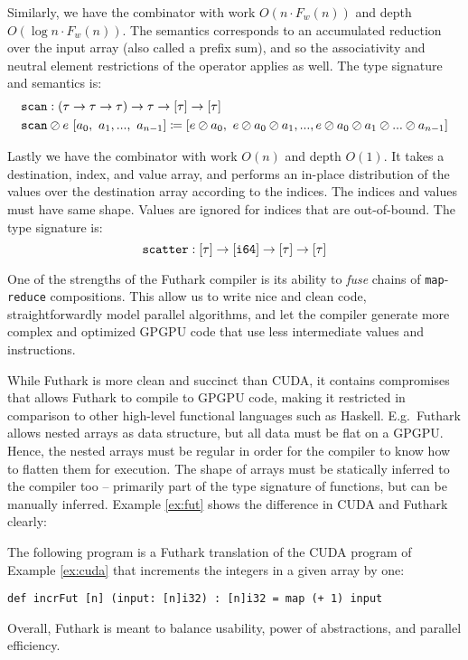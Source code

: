 Similarly, we have the combinator  with work $O(n\cdot F_w(n))$ and depth
$O(\log n \cdot F_w(n))$. The semantics corresponds to an accumulated reduction over
the input array (also called a prefix sum), and so the associativity and neutral
element restrictions of the operator applies as well. The type signature and
semantics is:
\begin{align}
  &\mathtt{scan}:(\tau \to \tau \to \tau) \to \tau \to \mathtt{[}\tau\mathtt{]} \to \mathtt{[}\tau\mathtt{]}\\
  & \mathtt{scan} \oslash e~[a_0,~a_1,...,~a_{n-1}] \coloneq [e \oslash a_0,~e \oslash a_0 \oslash a_1,..., e \oslash a_0 \oslash a_1 \oslash ...\oslash a_{n-1}]
\end{align}

Lastly we have the combinator  with work $O(n)$ and depth $O(1)$.
It takes a destination, index, and value array, and performs an in-place
distribution of the values over the destination array according to the
indices. The indices and values must have same shape. Values are ignored for
indices that are out-of-bound. The type signature is:
\begin{equation}
\mathtt{scatter}:\mathtt{[}\tau\mathtt{]} \to \mathtt{[}\mathtt{i64}\mathtt{]} \to \mathtt{[}\tau\mathtt{]} \to \mathtt{[}\tau\mathtt{]}
\end{equation}

One of the strengths of the Futhark compiler is its ability to \textit{fuse}
chains of \texttt{map}-\texttt{reduce} compositions. This allow us to write nice
and clean code, straightforwardly model parallel algorithms, and let the
compiler generate more complex and optimized GPGPU code that use less
intermediate values and instructions.

While Futhark is more clean and succinct than CUDA, it contains compromises that
allows Futhark to compile to GPGPU code, making it restricted in comparison to
other high-level functional languages such as Haskell. E.g.\ Futhark allows
nested arrays as data structure, but all data must be flat on a GPGPU. Hence,
the nested arrays must be regular in order for the compiler to know how to
flatten them for execution. The shape of arrays must be statically inferred to
the compiler too -- primarily part of the type signature of functions, but can be
manually inferred. Example \ref{ex:fut} shows the difference in CUDA and Futhark
clearly:

\begin{example}\label{ex:fut}
  The following program is a Futhark translation of the CUDA program of Example
  \ref{ex:cuda} that increments the integers in a given array by one:
\begin{lstlisting}[language=futhark]
def incrFut [n] (input: [n]i32) : [n]i32 = map (+ 1) input
\end{lstlisting}
\end{example}

Overall, Futhark is meant to balance usability, power of abstractions, and
parallel efficiency.

